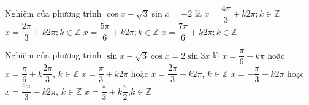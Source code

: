 	\begin{ex}%
	Nghiệm của phương trình $\cos x-\sqrt{3}\sin x=-2$ là
	\choice
	{$x=\dfrac{4\pi}{3}+k2\pi; k \in \mathbb{Z}$}
	{\True $x=\dfrac{2\pi}{3}+k2\pi; k \in \mathbb{Z}$}
	{$x=\dfrac{5\pi}{6}+k2\pi; k \in \mathbb{Z}$}
	{$x=\dfrac{7\pi}{6}+k2\pi; k \in \mathbb{Z}$}
	\end{ex}
	
	\begin{ex}%
	Nghiệm của phương trình $\sin x - \sqrt 3 \cos x = 2\sin 3x$ là
	\choice
	{$x = \dfrac{\pi }{6} + k\pi $ hoặc $x = \dfrac{\pi }{6} + k\dfrac{2\pi}{3}$, $ k\in \mathbb{Z} $}
	{$x = \dfrac{\pi }{3} + k2\pi $ hoặc $x = \dfrac{2\pi}{3} + k2\pi $, $ k\in \mathbb{Z} $}
	{$x =  - \dfrac{\pi }{3} + k2\pi $ hoặc $x = \dfrac{4\pi}{3} + k2\pi $, $ k\in \mathbb{Z} $}
	{\True $x = \dfrac{\pi }{3} + k\dfrac{\pi }{2}$,$  k\in \mathbb{Z} $}
	\end{ex}
	
